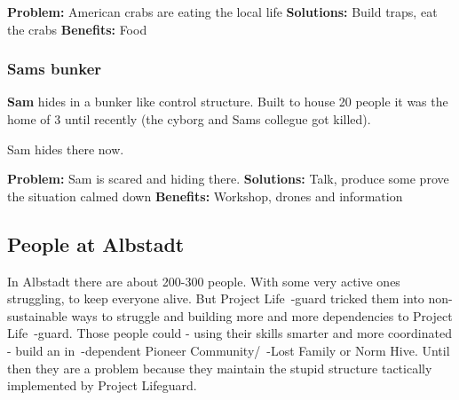 \textbf{Problem:} American crabs are eating the local life
\textbf{Solutions:} Build traps, eat the crabs
\textbf{Benefits:} Food

\subsubsection{Sams bunker}

\textbf{Sam} hides in a bunker like control structure. Built to house 20 people it was the home of 3 until recently (the cyborg and Sams collegue got killed).

Sam hides there now.

\textbf{Problem:} Sam is scared and hiding there.
\textbf{Solutions:} Talk, produce some prove the situation calmed down
\textbf{Benefits:} Workshop, drones and information


\subsection{People at Albstadt}

In Albstadt there are about 200-300 people. With some very active ones struggling, to keep everyone alive. But Project Life~-guard tricked them into non-sustainable ways to struggle and building more and more dependencies to Project Life~-guard. Those people could - using their skills smarter and more coordinated - build an in~-dependent Pioneer Community/~-Lost Family or Norm Hive. Until then they are a problem because they maintain the stupid structure tactically implemented by Project Lifeguard.


